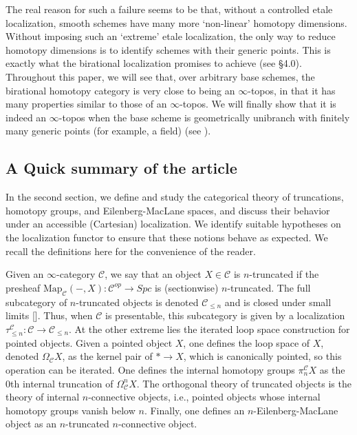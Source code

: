 The real reason for such a failure seems to be that, without a controlled etale localization, smooth schemes have many more `non-linear' homotopy dimensions. Without imposing such an `extreme' etale localization, the only way to reduce homotopy dimensions is to identify schemes with their generic points. This is exactly what the birational localization promises to achieve (see \S4.0). Throughout this paper, we will see that, over arbitrary base schemes, the birational homotopy category is very close to being an $\infty$-topos, in that it has many properties similar to those of an $\infty$-topos. We will finally show that it is indeed an $\infty$-topos when the base scheme is geometrically unibranch with finitely many generic points (for example, a field) (see ).

\subsection{A Quick summary of the article}
In the second section, we define and study the categorical theory of truncations, homotopy groups, and Eilenberg-MacLane spaces, and discuss their behavior under an accessible (Cartesian) localization. We identify suitable hypotheses on the localization functor to ensure that these notions behave as expected. We recall the definitions here for the convenience of the reader. 

Given an $\infty$-category $\mathcal{C}$, we say that an object $X\in \mathcal{C}$ is $n$-truncated if the presheaf $\mathrm{Map}_\mathcal{C}(-,X):\mathcal{C}^{op}\to Spc$ is (sectionwise) $n$-truncated. The full subcategory of $n$-truncated objects is denoted $\mathcal{C}_{\leq n}$ and is closed under small limits [\cite{lurie2009higher}]. Thus, when $\mathcal{C}$ is presentable, this subcategory is given by a localization $\tau_{\leq n}^{\mathcal{C}}:\mathcal{C}\to \mathcal{C}_{\leq n}$. At the other extreme lies the iterated loop space construction for pointed objects. Given a pointed object $X$, one defines the loop space of $X$, denoted $\Omega_\mathcal{C}X$, as the kernel pair of $*\to X$, which is canonically pointed, so this operation can be iterated. One defines the internal homotopy groups $\pi_n^\mathcal{C}X$ as the $0$th internal truncation of $\Omega^n_\mathcal{C}X$. The orthogonal theory of truncated objects is the theory of internal $n$-connective objects, i.e., pointed objects whose internal homotopy groups vanish below $n$. Finally, one defines an $n$-Eilenberg-MacLane object as an $n$-truncated $n$-connective object. 

